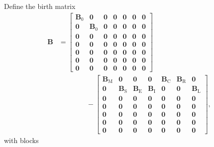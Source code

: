 \documentclass[12pt]{article}
\newcommand{\mat}[1]{\mathbf{#1}}
\begin{document}
Define the birth matrix
\begin{equation}
  \begin{split}
    \mat{B} &=
    \begin{bmatrix}
      \mat{B}_0 & \mat{0} & \mat{0} & \mat{0} &
      \mat{0} & \mat{0} & \mat{0}
      \\
      \mat{0} & \mat{B}_0 & \mat{0} & \mat{0} &
      \mat{0} & \mat{0} & \mat{0}
      \\
      \mat{0} & \mat{0} & \mat{0} & \mat{0} &
      \mat{0} & \mat{0} & \mat{0}
      \\
      \mat{0} & \mat{0} & \mat{0} & \mat{0} &
      \mat{0} & \mat{0} & \mat{0}
      \\
      \mat{0} & \mat{0} & \mat{0} & \mat{0} &
      \mat{0} & \mat{0} & \mat{0}
      \\
      \mat{0} & \mat{0} & \mat{0} & \mat{0} &
      \mat{0} & \mat{0} & \mat{0}
      \\
      \mat{0} & \mat{0} & \mat{0} & \mat{0} &
      \mat{0} & \mat{0} & \mat{0}
    \end{bmatrix}
    \\ & \quad\quad\quad\quad {}
    -
    \begin{bmatrix}
      \mat{B}_{\mathrm{M}} & \mat{0} & \mat{0} & \mat{0} &
      \mat{B}_{\mathrm{C}} & \mat{B}_{\mathrm{R}} & \mat{0}
      \\
      \mat{0} & \mat{B}_{\mathrm{S}} &
      \mat{B}_{\mathrm{E}} & \mat{B}_{\mathrm{I}} &
      \mat{0} & \mat{0} & \mat{B}_{\mathrm{L}}
      \\
      \mat{0} & \mat{0} & \mat{0} & \mat{0} &
      \mat{0} & \mat{0} & \mat{0}
      \\
      \mat{0} & \mat{0} & \mat{0} & \mat{0} &
      \mat{0} & \mat{0} & \mat{0}
      \\
      \mat{0} & \mat{0} & \mat{0} & \mat{0} &
      \mat{0} & \mat{0} & \mat{0}
      \\
      \mat{0} & \mat{0} & \mat{0} & \mat{0} &
      \mat{0} & \mat{0} & \mat{0}
      \\
      \mat{0} & \mat{0} & \mat{0} & \mat{0} &
      \mat{0} & \mat{0} & \mat{0}
    \end{bmatrix},
  \end{split}
\end{equation}
with blocks
\end{document}
